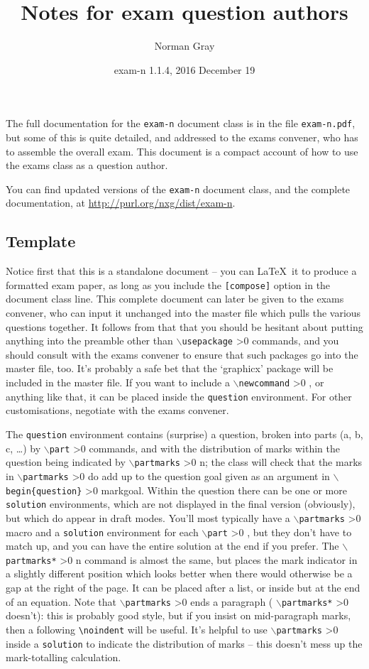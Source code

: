 \documentclass[10pt]{scrartcl}
\title{Notes for exam question authors}
\author{Norman Gray}
\date{exam-n 1.1.4, 2016 December 19}
\makeatletter
\def\csarg#1{\texttt\{\textit{#1}\texttt\}%
  \advance\@tempcnta-1
  \ifnum\@tempcnta>0
    \let\next\csarg
  \else
    \let\next\endgroup          %
  \fi
  \next}
\newcommand\cs[2][0]{\begingroup
  \color{cscolour}%
  $\backslash$\texttt{#2}%
  \@tempcnta=#1
  \ifnum\@tempcnta>0
    \let\next\csarg
  \else
    \let\next\endgroup
  \fi
  \next}
\def\env#1{\texttt{\textcolor{cscolour}{#1}}}
\def\opt#1{\texttt{[#1]}}
\makeatother
\begin{document}
\maketitle

The full documentation for the \texttt{exam-n} document class is in
the file \texttt{exam-n.pdf}, but some of this is quite detailed, and
addressed to the exams convener, who has to assemble the overall
exam.  This document is a compact account of how to use the exams
class as a question author.

You can find updated versions of the \texttt{exam-n} document class, and the
complete documentation, at \url{http://purl.org/nxg/dist/exam-n}.

\subsection{Template}
\label{s:template}

Notice first that this is a standalone document -- you can \LaTeX\ it
to produce a formatted exam paper, as long as you include the
\opt{compose} option in the document class line.  This complete
document can later be given to the exams convener, who can
input it unchanged into the master file which pulls the various questions
together.  It follows from that that you should be hesitant about putting anything into
the preamble other than \cs{usepackage} commands, and you should
consult with the exams convener to ensure that such packages go into
the master file, too.  It's probably a safe bet that the `graphicx'
package will be included in the master file.  If you want to include 
a \cs{newcommand}, or anything like that,
it can be placed inside the \env{question} environment.  For
other customisations, negotiate with the exams convener.

The \env{question} environment contains (surprise) a question, broken into
parts (a, b, c, \dots) by \cs{part} commands, and with the distribution of marks within
the question being indicated by \cs[1]{partmarks}n; the class will check that the
marks in \cs{partmarks} do add up to the question goal given as an
argument in \cs[1]{begin\{question\}}{markgoal}.  Within the
question there can be one or more \env{solution} environments, which are
not displayed in the final version (obviously), but which do appear in
draft modes.  You'll most typically have a \cs{partmarks} macro and a
\env{solution} environment for each \cs{part}, but they don't have to
match up, and you can have the entire solution at the end if you prefer.
The \cs[1]{partmarks*}n command is almost the same, but places the
mark indicator in a slightly different position which looks better
when there would otherwise be a gap at the right of the page.  It can
be placed after a list, or inside but at the end of an equation.
Note that \cs{partmarks} ends a paragraph (\cs{partmarks*} doesn't): this is
probably good style, but if you insist on mid-paragraph marks, then a following
\verb|\noindent| will be useful.  It's helpful to use \cs{partmarks} inside a
\env{solution} to indicate the distribution of marks -- this doesn't mess up
the mark-totalling calculation.
\end{document}
